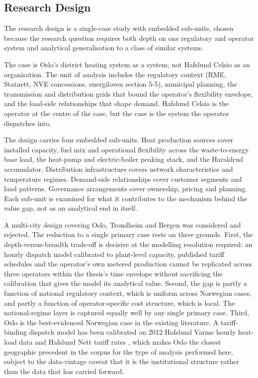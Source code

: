 \subsection{Research Design}
\label{3-subsec:3.1 research design}

The research design is a single-case study with embedded sub-units, chosen because the research question requires both depth on one regulatory and operator system and analytical generalisation to a class of similar systems.

The case is Oslo's district heating system as a system, not Hafslund Celsio as an organisation. The unit of analysis includes the regulatory context (RME, Statnett, NVE concessions, energiloven section 5-5), municipal planning, the transmission and distribution grids that bound the operator's flexibility envelope, and the load-side relationships that shape demand. Hafslund Celsio is the operator at the centre of the case, but the case is the system the operator dispatches into.

The design carries four embedded sub-units. Heat production sources cover installed capacity, fuel mix and operational flexibility across the waste-to-energy base load, the heat-pump and electric-boiler peaking stack, and the Haraldrud accumulator. Distribution infrastructure covers network characteristics and temperature regimes. Demand-side relationships cover customer segments and load patterns. Governance arrangements cover ownership, pricing and planning. Each sub-unit is examined for what it contributes to the mechanism behind the value gap, not as an analytical end in itself.

A multi-city design covering Oslo, Trondheim and Bergen was considered and rejected. The reduction to a single primary case rests on three grounds. First, the depth-versus-breadth trade-off is decisive at the modelling resolution required: an hourly dispatch model calibrated to plant-level capacity, published tariff schedules and the operator's own metered production cannot be replicated across three operators within the thesis's time envelope without sacrificing the calibration that gives the model its analytical value. Second, the gap is partly a function of national regulatory context, which is uniform across Norwegian cases, and partly a function of operator-specific cost structure, which is local. The national-regime layer is captured equally well by any single primary case. Third, Oslo is the best-evidenced Norwegian case in the existing literature. A tariff-binding dispatch model has been calibrated on 2012 Hafslund Varme hourly heat-load data and Hafslund Nett tariff rates \cite{kirkerud_impacts_2016}, which makes Oslo the closest geographic precedent in the corpus for the type of analysis performed here, subject to the data-vintage caveat that it is the institutional structure rather than the data that has carried forward.

